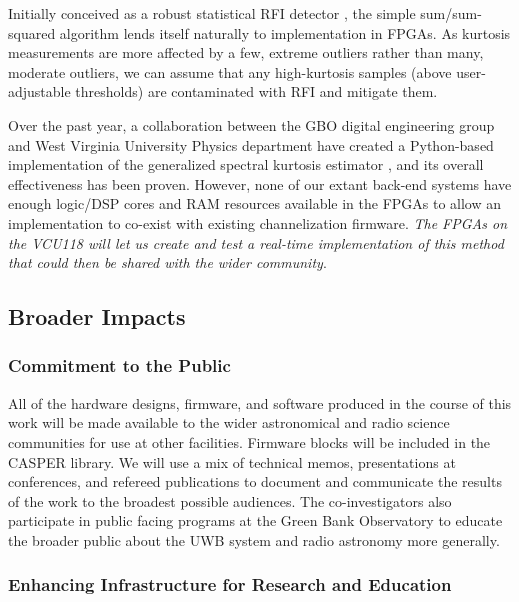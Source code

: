 \documentclass[10pt]{myNSF}
\begin{document}
 Initially conceived as a robust
statistical RFI detector \citep{ng10,nhmg16}, the simple
sum/sum-squared algorithm lends itself naturally to implementation in
FPGAs.  As kurtosis measurements are more affected by a few, extreme
outliers rather than many, moderate outliers, we can assume that any
high-kurtosis samples (above user-adjustable thresholds) are
contaminated with RFI and mitigate them.

Over the past year, a collaboration between the GBO digital
engineering group and West Virginia University Physics department have
created a Python-based implementation of the generalized spectral
kurtosis estimator \citep{ng10}, and its overall effectiveness has
been proven.  However, none of our extant back-end systems have enough
logic/DSP cores and RAM resources available in the FPGAs to allow an
implementation to co-exist with existing channelization firmware.
\emph{The FPGAs on the VCU118 will let us create and test a real-time
  implementation of this method that could then be shared with the
  wider community}.

\subsection{Broader Impacts}
\label{sec:BI}

\subsubsection{Commitment to the Public}
\label{sec:commitment}

All of the hardware designs, firmware, and software produced in the
course of this work will be made available to the wider astronomical
and radio science communities for use at other facilities.  Firmware
blocks will be included in the CASPER library.  We will use a mix of
technical memos, presentations at conferences, and refereed
publications to document and communicate the results of the work to
the broadest possible audiences.  The co-investigators also
participate in public facing programs at the Green Bank Observatory to
educate the broader public about the UWB system and radio astronomy
more generally.

\subsubsection{Enhancing Infrastructure for Research and Education}
\label{sec:infrastructure}
\end{document}
